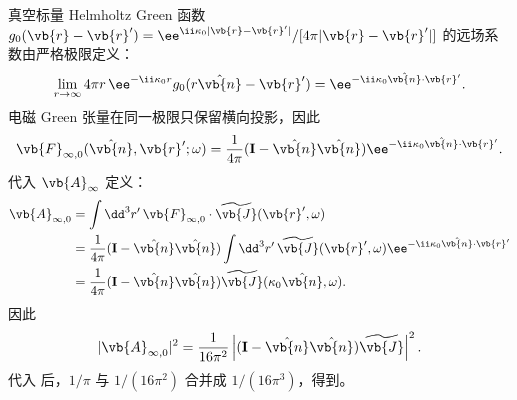 \begin{derivation}[自由空间电流的光子辐射概率]
真空标量 Helmholtz Green 函数
$g_0(\vb{r}-\vb{r}')=\ee^{\ii\kappa_0|\vb{r}-\vb{r}'|}/[4\pi|\vb{r}-\vb{r}'|]$ 的远场系数由严格极限定义：
\begin{equation*}
\lim_{r\to\infty}
4\pi r\,\ee^{-\ii\kappa_0r}
 g_0(r\hat{\vb{n}}-\vb{r}')
=\ee^{-\ii\kappa_0\hat{\vb{n}}\cdot\vb{r}'}.
\end{equation*}
电磁 Green 张量在同一极限只保留横向投影，因此
\[
\vb{F}_{\infty,0}
(\hat{\vb{n}},\vb{r}';\omega)
=\frac1{4\pi}
(\mathbf I-\hat{\vb{n}}\hat{\vb{n}})
\ee^{-\ii\kappa_0\hat{\vb{n}}\cdot\vb{r}'}.
\]
代入 $\vb{A}_\infty$ 定义：
\begin{align*}
\vb{A}_{\infty,0}
&=\int\dd^3 r'\,
\vb{F}_{\infty,0}\cdot\widetilde{\vb{J}}(\vb{r}',\omega)\\
&=\frac1{4\pi}
(\mathbf I-\hat{\vb{n}}\hat{\vb{n}})
\int\dd^3 r'\,\widetilde{\vb{J}}(\vb{r}',\omega)
\ee^{-\ii\kappa_0\hat{\vb{n}}\cdot\vb{r}'}\\
&=\frac1{4\pi}
(\mathbf I-\hat{\vb{n}}\hat{\vb{n}})
\widetilde{\vb{J}}(\kappa_0\hat{\vb{n}},\omega).
\end{align*}
因此
\[
|\vb{A}_{\infty,0}|^2
=\frac1{16\pi^2}
\left|(\mathbf I-\hat{\vb{n}}\hat{\vb{n}})
\widetilde{\vb{J}}\right|^2.
\]
代入 后，$1/\pi$ 与 $1/(16\pi^2)$ 合并成 $1/(16\pi^3)$，得到。
\end{derivation}

